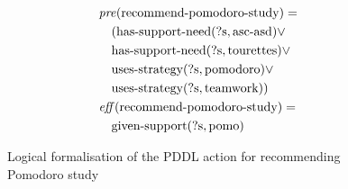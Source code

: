 \begin{figure}[t]
  \small  %
  \begin{align*}
  &\mathit{pre}(\text{recommend-pomodoro-study}) = \\
  &\quad (\text{has-support-need}(\text{?s}, \text{asc-asd}) \lor \\
  &\quad \text{has-support-need}(\text{?s}, \text{tourettes}) \lor \\
  &\quad \text{uses-strategy}(\text{?s}, \text{pomodoro}) \lor \\
  &\quad \text{uses-strategy}(\text{?s}, \text{teamwork})) \\
  &\mathit{eff}(\text{recommend-pomodoro-study}) = \\
  &\quad \text{given-support}(\text{?s}, \text{pomo})
  \end{align*}
  \caption{Logical formalisation of the PDDL action for recommending Pomodoro study}\label{fig:pomo-study}
\end{figure}
